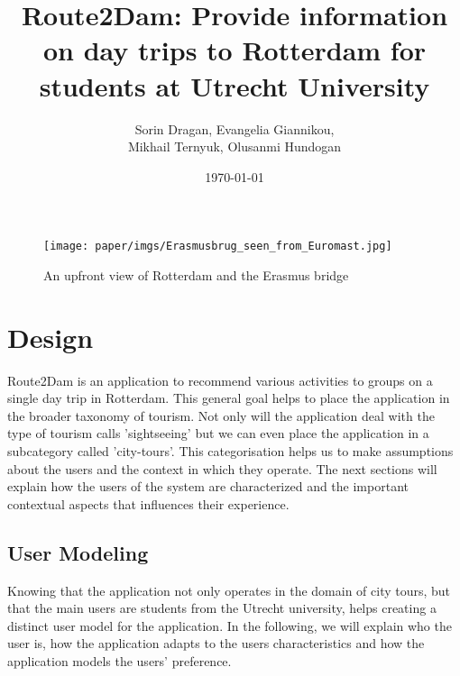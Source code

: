 \documentclass[11pt,a4paper,oneside]{article}
\title{\textbf{Route2Dam: Provide information on day trips to Rotterdam for students at Utrecht University}\newline \newline \newline}
\date{\today}
\author{Sorin Dragan, Evangelia Giannikou, \\Mikhail Ternyuk, Olusanmi Hundogan}
\begin{document}
\maketitle


\begin{figure}[H]
    \texttt{[image: paper/imgs/Erasmusbrug\_seen\_from\_Euromast.jpg]}
    \caption{An upfront view of Rotterdam and the Erasmus bridge}
\end{figure}


\clearpage
\section{Design}
Route2Dam is an application to recommend various activities to groups on a single day trip in Rotterdam. This general goal helps to place the application in the broader taxonomy of tourism. Not only will the application deal with the type of tourism \citeauthor{dunnross_SightseeingTouristsMotivation_1991} calls 'sightseeing' but we can even place the application in a subcategory called 'city-tours'. This categorisation helps us to make assumptions about the users and the context in which they operate. The next sections will explain how the users of the system are characterized and the important contextual aspects that influences their experience. 
\subsection{User Modeling}
\label{lbl:UM}
Knowing that the application not only operates in the domain of city tours, but that the main users are students from the Utrecht university, helps creating a distinct user model for the application. In the following, we will explain who the user is, how the application adapts to the users characteristics and how the application models the users' preference. 
\end{document}
